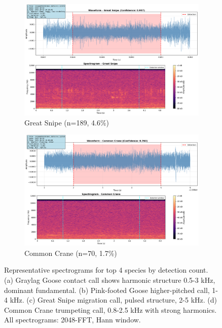 \documentclass[twocolumn]{article}
\begin{document}
\begin{figure}[t]
\begin{subfigure}{0.47\textwidth}
\centering
\includegraphics[width=\textwidth]{figures/spectrogram_great_snipe.png}
\caption{Great Snipe (n=189, 4.6\%)}
\end{subfigure}
\hfill
\begin{subfigure}{0.47\textwidth}
\centering
\includegraphics[width=\textwidth]{figures/spectrogram_common_crane.png}
\caption{Common Crane (n=70, 1.7\%)}
\end{subfigure}
\caption{Representative spectrograms for top 4 species by detection count. (a) Graylag Goose contact call shows harmonic structure 0.5-3 kHz, dominant fundamental. (b) Pink-footed Goose higher-pitched call, 1-4 kHz. (c) Great Snipe migration call, pulsed structure, 2-5 kHz. (d) Common Crane trumpeting call, 0.8-2.5 kHz with strong harmonics. All spectrograms: 2048-FFT, Hann window.}
\label{fig:top_species_spectrograms}
\end{figure}
\end{document}
